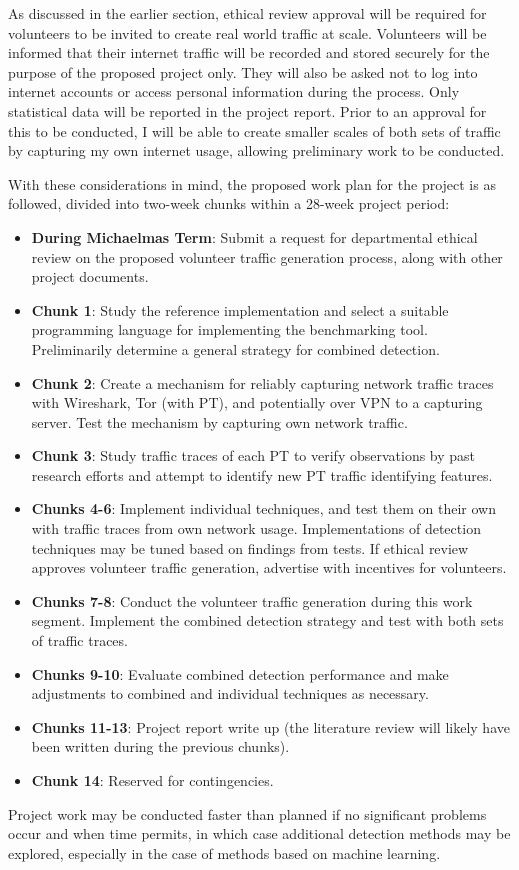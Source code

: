 \documentclass[11pt]{article}
\begin{document}
As discussed in the earlier section, ethical review approval will be required for volunteers to be invited to create real world traffic at scale. Volunteers will be informed that their internet traffic will be recorded and stored securely for the purpose of the proposed project only. They will also be asked not to log into internet accounts or access personal information during the process. Only statistical data will be reported in the project report. Prior to an approval for this to be conducted, I will be able to create smaller scales of both sets of traffic by capturing my own internet usage, allowing preliminary work to be conducted. 

With these considerations in mind, the proposed work plan for the project is as followed, divided into two-week chunks within a 28-week project period:

\begin{itemize}
	\item \textbf{During Michaelmas Term}: Submit a request for departmental ethical review on the proposed volunteer traffic generation process, along with other project documents.
	\item \textbf{Chunk 1}: Study the reference implementation and select a suitable programming language for implementing the benchmarking tool. Preliminarily determine a general strategy for combined detection.
	\item \textbf{Chunk 2}: Create a mechanism for reliably capturing network traffic traces with Wireshark, Tor (with PT), and potentially over VPN to a capturing server. Test the mechanism by capturing own network traffic.
	\item \textbf{Chunk 3}: Study traffic traces of each PT to verify observations by past research efforts and attempt to identify new PT traffic identifying features.
	\item \textbf{Chunks 4-6}: Implement individual techniques, and test them on their own with traffic traces from own network usage. Implementations of detection techniques may be tuned based on findings from tests.  If ethical review approves volunteer traffic generation, advertise with incentives for volunteers.
	\item \textbf{Chunks 7-8}: Conduct the volunteer traffic generation during this work segment. Implement the combined detection strategy and test with both sets of traffic traces. 
	\item \textbf{Chunks 9-10}: Evaluate combined detection performance and make adjustments to combined and individual techniques as necessary.
	\item \textbf{Chunks 11-13}: Project report write up (the literature review will likely have been written during the previous chunks).
	\item \textbf{Chunk 14}: Reserved for contingencies.
\end{itemize}

Project work may be conducted faster than planned if no significant problems occur and when time permits, in which case additional detection methods may be explored, especially in the case of methods based on machine learning.


\footnotesize{}
\end{document}
